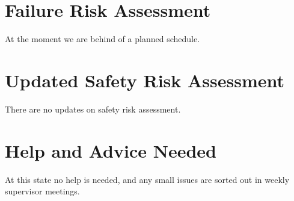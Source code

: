 \documentclass[a4paper,12pt]{article}
\begin{document}
	\section{Failure Risk Assessment}
	At the moment we are behind of a planned schedule.
	
	\section{Updated Safety Risk Assessment}
    There are no updates on safety risk assessment.
    
    \section{Help and Advice Needed}
    At this state no help is needed, and any small issues are sorted out in weekly supervisor meetings.
	
\end{document}
